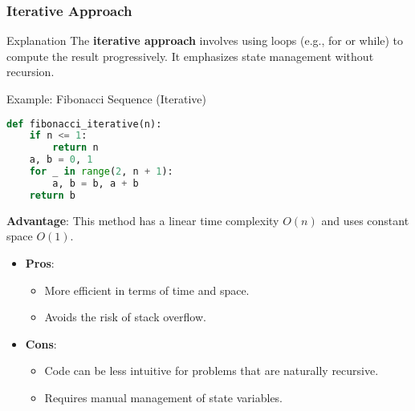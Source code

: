 \documentclass[aspectratio=169]{beamer}
\begin{document}
\begin{frame}[fragile]
  \frametitle{Iterative Approach}
  \begin{block}{Explanation}
    The \textbf{iterative approach} involves using loops (e.g., for or while) to compute the result progressively. It emphasizes state management without recursion.
  \end{block}

  \begin{block}{Example: Fibonacci Sequence (Iterative)}
    \begin{lstlisting}[language=Python]
def fibonacci_iterative(n):
    if n <= 1:
        return n
    a, b = 0, 1
    for _ in range(2, n + 1):
        a, b = b, a + b
    return b
    \end{lstlisting}
    \textbf{Advantage}: This method has a linear time complexity \( O(n) \) and uses constant space \( O(1) \).
  \end{block}

  \begin{itemize}
    \item \textbf{Pros}:
      \begin{itemize}
        \item More efficient in terms of time and space.
        \item Avoids the risk of stack overflow.
      \end{itemize}
    \item \textbf{Cons}:
      \begin{itemize}
        \item Code can be less intuitive for problems that are naturally recursive.
        \item Requires manual management of state variables.
      \end{itemize}
  \end{itemize}
\end{frame}
\end{document}
